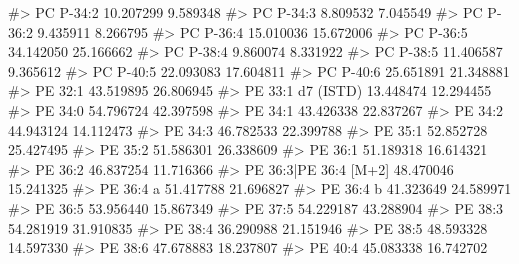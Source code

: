 \documentclass[
  letterpaper,
  DIV=11,
  numbers=noendperiod]{scrreprt}
\newenvironment{Shaded}{\begin{snugshade}}{\end{snugshade}}
\newcommand{\CommentTok}[1]{\textcolor[rgb]{0.37,0.37,0.37}{#1}}
\begin{document}
\begin{Shaded}
\begin{Highlighting}[]
\CommentTok{\#\textgreater{} PC P{-}34:2                                 10.207299  9.589348}
\CommentTok{\#\textgreater{} PC P{-}34:3                                  8.809532  7.045549}
\CommentTok{\#\textgreater{} PC P{-}36:2                                  9.435911  8.266795}
\CommentTok{\#\textgreater{} PC P{-}36:4                                 15.010036 15.672006}
\CommentTok{\#\textgreater{} PC P{-}36:5                                 34.142050 25.166662}
\CommentTok{\#\textgreater{} PC P{-}38:4                                  9.860074  8.331922}
\CommentTok{\#\textgreater{} PC P{-}38:5                                 11.406587  9.365612}
\CommentTok{\#\textgreater{} PC P{-}40:5                                 22.093083 17.604811}
\CommentTok{\#\textgreater{} PC P{-}40:6                                 25.651891 21.348881}
\CommentTok{\#\textgreater{} PE 32:1                                   43.519895 26.806945}
\CommentTok{\#\textgreater{} PE 33:1 d7 (ISTD)                         13.448474 12.294455}
\CommentTok{\#\textgreater{} PE 34:0                                   54.796724 42.397598}
\CommentTok{\#\textgreater{} PE 34:1                                   43.426338 22.837267}
\CommentTok{\#\textgreater{} PE 34:2                                   44.943124 14.112473}
\CommentTok{\#\textgreater{} PE 34:3                                   46.782533 22.399788}
\CommentTok{\#\textgreater{} PE 35:1                                   52.852728 25.427495}
\CommentTok{\#\textgreater{} PE 35:2                                   51.586301 26.338609}
\CommentTok{\#\textgreater{} PE 36:1                                   51.189318 16.614321}
\CommentTok{\#\textgreater{} PE 36:2                                   46.837254 11.716366}
\CommentTok{\#\textgreater{} PE 36:3|PE 36:4 [M+2]                     48.470046 15.241325}
\CommentTok{\#\textgreater{} PE 36:4 a                                 51.417788 21.696827}
\CommentTok{\#\textgreater{} PE 36:4 b                                 41.323649 24.589971}
\CommentTok{\#\textgreater{} PE 36:5                                   53.956440 15.867349}
\CommentTok{\#\textgreater{} PE 37:5                                   54.229187 43.288904}
\CommentTok{\#\textgreater{} PE 38:3                                   54.281919 31.910835}
\CommentTok{\#\textgreater{} PE 38:4                                   36.290988 21.151946}
\CommentTok{\#\textgreater{} PE 38:5                                   48.593328 14.597330}
\CommentTok{\#\textgreater{} PE 38:6                                   47.678883 18.237807}
\CommentTok{\#\textgreater{} PE 40:4                                   45.083338 16.742702}

\end{Highlighting}
\end{Shaded}
\end{document}
